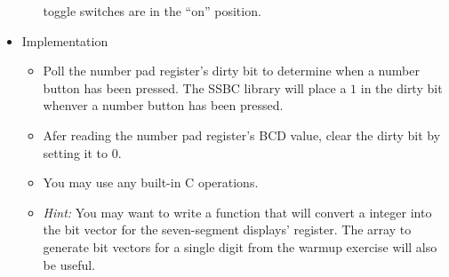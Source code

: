 \documentclass[12pt]{article}
\begin{document}
\begin{itemize}
\begin{itemize}
            toggle switches are in the ``on'' position.
    \end{itemize}
    \item Implementation
    \begin{itemize}
        \item Poll the number pad register's dirty bit to determine when a
            number button has been pressed. The SSBC library will place a $1$
            in the dirty bit whenver a number button has been pressed.
        \item Afer reading the number pad register's BCD value, clear the dirty
            bit by setting it to $0$.
        \item You may use any built-in C operations.
        \item \textit{Hint: } You may want to write a function that will
            convert a integer into the bit vector for the seven-segment
            displays' register. The array to generate bit vectors for a single
            digit from the warmup exercise will also be useful.
    \end{itemize}
\end{itemize}
\end{document}
